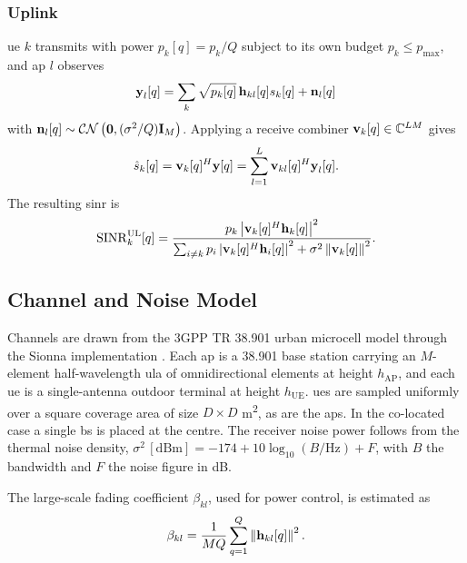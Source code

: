 \subsubsection{Uplink}
\gls{ue} $k$ transmits with power $p_{k}[q]=p_{k}/Q$ subject to its own budget
$p_{k}\leq p_{\max}$, and \gls{ap} $l$ observes
\begin{align}
\boldsymbol{\mathrm{y}}_{l}[q]=\sum_{k}\sqrt{p_{k}[q]}\,\boldsymbol{\mathrm{h}}_{kl}[q]s_{k}[q]+\boldsymbol{\mathrm{n}}_{l}[q]\end{align}
with $\boldsymbol{\mathrm{n}}_{l}[q]\sim\mathcal{C}\mathcal{N}\left(\boldsymbol{\mathrm{0}},(\sigma^{2}/Q)\boldsymbol{\mathrm{I}}_{M}\right)$. Applying a receive combiner $\boldsymbol{\mathrm{v}}_{k}[q]\in\mathbb{C}^{LM}$ gives
\begin{equation}
\label{eq:ul-distributive}
\hat{s}_{k}[q] = \boldsymbol{\mathrm{v}}_{k}[q]^{H}\boldsymbol{\mathrm{y}}[q]
= \sum_{l=1}^{L}\boldsymbol{\mathrm{v}}_{kl}[q]^{H}\boldsymbol{\mathrm{y}}_{l}[q] .
\end{equation}
The resulting \gls{sinr} is
\begin{equation}
\label{eq:ul-sinr}
\mathrm{SINR}_{k}^{\mathrm{UL}}[q] =
\frac{p_{k}\left\lvert\boldsymbol{\mathrm{v}}_{k}[q]^{H}\boldsymbol{\mathrm{h}}_{k}[q]\right\rvert^{2}}
{\sum_{i\neq k}p_{i}\left\lvert\boldsymbol{\mathrm{v}}_{k}[q]^{H}\boldsymbol{\mathrm{h}}_{i}[q]\right\rvert^{2}
+ \sigma^{2}\left\lVert\boldsymbol{\mathrm{v}}_{k}[q]\right\rVert^{2}}.
\end{equation}


\subsection{Channel and Noise Model}
\label{ssec:channel}

Channels are drawn from the 3GPP TR 38.901 urban microcell model \cite{tr38901}
through the Sionna implementation \cite{hoydis2022sionna}. Each \gls{ap} is a
38.901 base station carrying an $M$-element half-wavelength \gls{ula} of
omnidirectional elements at height $h_{\mathrm{AP}}$, and each \gls{ue} is a
single-antenna outdoor terminal at height $h_{\mathrm{UE}}$. \glspl{ue} are
sampled uniformly over a square coverage area of size $D\times D$ \si{\metre\squared}, as are the \glspl{ap}.
In the co-located case a single \gls{bs} is placed at the centre. The receiver noise power follows from the thermal noise density,
$\sigma^{2}\,[\mathrm{dBm}] = -174 + 10\log_{10}(B/\mathrm{Hz}) + F$, with $B$
the bandwidth and $F$ the noise figure in dB.

The large-scale fading coefficient $\beta_{kl}$, used for power control, is estimated as 
\begin{equation}
\label{eq:beta}
\beta_{kl} = \frac{1}{MQ}\sum_{q=1}^{Q}\left\lVert\boldsymbol{\mathrm{h}}_{kl}[q]\right\rVert^{2}.
\end{equation}


